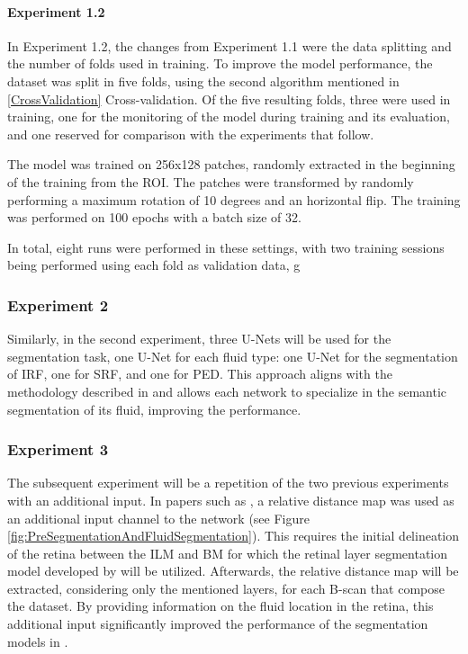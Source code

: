 \paragraph{Experiment 1.2}
In Experiment 1.2, the changes from Experiment 1.1 were the data splitting and the number of folds used in training. To improve the model performance, the dataset was split in five folds, using the second algorithm mentioned in \ref{CrossValidation} Cross-validation. Of the five resulting folds, three were used in training, one for the monitoring of the model during training and its evaluation, and one reserved for comparison with the experiments that follow.
\par
The model was trained on 256x128 patches, randomly extracted in the beginning of the training from the ROI. The patches were transformed by randomly performing a maximum rotation of 10 degrees and an horizontal flip. The training was performed on 100 epochs with a batch size of 32.
\par
In total, eight runs were performed in these settings, with two training sessions being performed using each fold as validation data, g

\subsubsection{Experiment 2}\label{Experiment2}
Similarly, in the second experiment, three U-Nets will be used for the segmentation task, one U-Net for each fluid type: one U-Net for the segmentation of IRF, one for SRF, and one for PED. This approach aligns with the methodology described in \textcite{Rahil2023, Padilla2022} and allows each network to specialize in the semantic segmentation of its fluid, improving the performance.

\subsubsection{Experiment 3}\label{Experiment3}
The subsequent experiment will be a repetition of the two previous experiments with an additional input. In papers such as \parencite{Tang2022, Lu2019, Rahil2023}, a relative distance map was used as an additional input channel to the network (see Figure \ref{fig:PreSegmentationAndFluidSegmentation}). This requires the initial delineation of the retina between the ILM and BM for which the retinal layer segmentation model developed by \textcite{Melo2023} will be utilized. Afterwards, the relative distance map will be extracted, considering only the mentioned layers, for each B-scan that compose the dataset. By providing information on the fluid location in the retina, this additional input significantly improved the performance of the segmentation models in \parencite{Tang2022, Lu2019, Rahil2023}.

